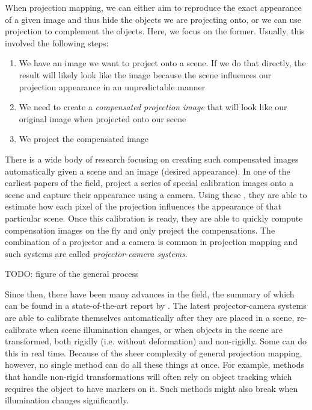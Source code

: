 When projection mapping, we can either aim to reproduce the exact appearance of a given image and thus hide the objects we are projecting onto, or we can use projection to complement the objects. Here, we focus on the former. Usually, this involved the following steps:

\begin{enumerate}
    \item We have an image we want to project onto a scene. If we do that directly, the result will likely look like the image because the scene influences our projection appearance in an unpredictable manner
    \item We need to create a \textit{compensated projection image} that will look like our original image when projected onto our scene
    \item We project the compensated image
\end{enumerate}

There is a wide body of research focusing on creating such compensated images automatically given a scene and an image (desired appearance). In one of the earliest papers of the field, \citet*{Grossberg2004} project a series of special calibration images onto a scene and capture their appearance using a camera. Using these , they are able to estimate how each pixel of the projection influences the appearance of that particular scene. Once this calibration is ready, they are able to quickly compute compensation images on the fly and only project the compensations. The combination of a projector and a camera is common in projection mapping and such systems are called \textit{projector-camera systems}.

{\color{red} TODO: figure of the general process}

Since then, there have been many advances in the field, the summary of which can be found in a state-of-the-art report by \citet*{Grundhofer2018}. The latest projector-camera systems are able to calibrate themselves automatically after they are placed in a scene, re-calibrate when scene illumination changes, or when objects in the scene are transformed, both rigidly (i.e. without deformation) and non-rigidly. Some can do this in real time. Because of the sheer complexity of general projection mapping, however, no single method can do all these things at once. For example, methods that handle non-rigid transformations will often rely on object tracking which requires the object to have markers on it. Such methods might also break when illumination changes significantly.


